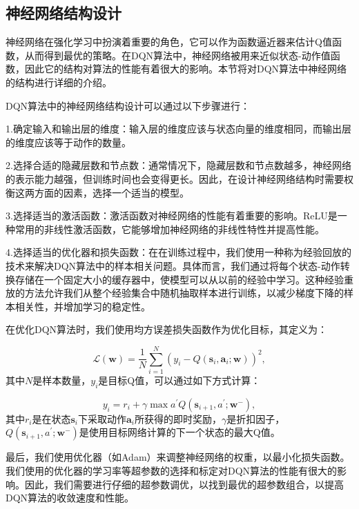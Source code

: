 \subsection{神经网络结构设计}


神经网络在强化学习中扮演着重要的角色，它可以作为函数逼近器来估计Q值函数，从而得到最优的策略。在DQN算法中，神经网络被用来近似状态-动作值函数，因此它的结构对算法的性能有着很大的影响。本节将对DQN算法中神经网络的结构进行详细的介绍。

DQN算法中的神经网络结构设计可以通过以下步骤进行：

1.确定输入和输出层的维度：输入层的维度应该与状态向量的维度相同，而输出层的维度应该等于动作的数量。

2.选择合适的隐藏层数和节点数：通常情况下，隐藏层数和节点数越多，神经网络的表示能力越强，但训练时间也会变得更长。因此，在设计神经网络结构时需要权衡这两方面的因素，选择一个适当的模型。

3.选择适当的激活函数：激活函数对神经网络的性能有着重要的影响。ReLU是一种常用的非线性激活函数，它能够增加神经网络的非线性特性并提高性能。

4.选择适当的优化器和损失函数：在在训练过程中，我们使用一种称为经验回放的技术来解决DQN算法中的样本相关问题。具体而言，我们通过将每个状态-动作转换存储在一个固定大小的缓存器中，使模型可以从以前的经验中学习。这种经验重放的方法允许我们从整个经验集合中随机抽取样本进行训练，以减少梯度下降的样本相关性，并增加学习的稳定性。

在优化DQN算法时，我们使用均方误差损失函数作为优化目标，其定义为：

\begin{equation}
\mathcal{L}(\mathbf{w})=\frac{1}{N} \sum_{i=1}^{N}\left(y_{i}-Q\left(\bm{s}_{i}, \bm{a}_{i} ; \mathbf{w}\right)\right)^{2},
\end{equation}
其中$N$是样本数量，$y_i$是目标Q值，可以通过如下方式计算：

\begin{equation}
y_{i}=r_{i}+\gamma \max {a^{\prime}} Q\left(\bm{s}_{i+1}, a^{\prime} ; \mathbf{w}^{-}\right),
\end{equation}
其中$r_i$是在状态$\bm{s}_i$下采取动作$\bm{a}_i$所获得的即时奖励，$\gamma$是折扣因子，$Q(\bm{s}_{i+1},a^{\prime};\mathbf{w}^{-})$是使用目标网络计算的下一个状态的最大Q值。

最后，我们使用优化器（如Adam）来调整神经网络的权重，以最小化损失函数。我们使用的优化器的学习率等超参数的选择和标定对DQN算法的性能有很大的影响。因此，我们需要进行仔细的超参数调优，以找到最优的超参数组合，以提高DQN算法的收敛速度和性能。


